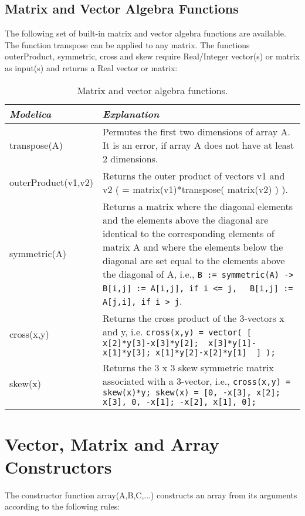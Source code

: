 \subsection{Matrix and Vector Algebra Functions}

The following set of built-in matrix and vector algebra functions are
available. The function transpose can be applied to any matrix. The
functions outerProduct, symmetric, cross and skew require Real/Integer
vector(s) or matrix as input(s) and returns a Real vector or matrix:

\begin{longtable}[]{|p{3.5cm}|p{11.5cm}|}
\caption{Matrix and vector algebra functions.}\\
\hline
\emph{Modelica} & \emph{Explanation}\\ \hline
\endhead
transpose(A)
& Permutes the first two dimensions of array A. It is an error, if array A
does not have at least 2 dimensions.\\ \hline
outerProduct(v1,v2)
& Returns the outer product of vectors v1 and v2 ( = matrix(v1)*transpose(
matrix(v2) ) ).\\ \hline
symmetric(A)
& Returns a matrix where the diagonal elements and the elements above the
diagonal are identical to the corresponding elements of matrix A and
where the elements below the diagonal are set equal to the elements
above the diagonal of A, i.e., \lstinline!B := symmetric(A) ->!
  \lstinline!B[i,j] := A[i,j], if i <= j, ! \lstinline! B[i,j] := A[j,i], if i > j!.\\ \hline
cross(x,y)
& Returns the cross product of the 3-vectors x and y, i.e.
\lstinline!cross(x,y) = vector( [ x[2]*y[3]-x[3]*y[2];  x[3]*y[1]-x[1]*y[3]; x[1]*y[2]-x[2]*y[1]  ] );!\\ \hline
skew(x)
& Returns the 3 x 3 skew symmetric matrix associated with a 3-vector,
  i.e., \lstinline!cross(x,y) = skew(x)*y; skew(x) = [0, -x[3], x[2]; x[3], 0, -x[1]; -x[2], x[1], 0];!\\ \hline
\end{longtable}

\section{Vector, Matrix and Array Constructors}

The constructor function array(A,B,C,...) constructs an array from its
arguments according to the following rules:

